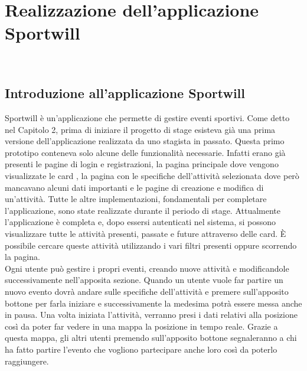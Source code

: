 
\chapter{Realizzazione dell'applicazione Sportwill}
\label{cap:Sportwill}

\\


\section{Introduzione all'applicazione Sportwill}
Sportwill è un'applicazione che permette di gestire eventi sportivi.
Come detto nel Capitolo 2, prima di iniziare il progetto di stage esisteva già una prima versione dell'applicazione realizzata da uno stagista in passato.
Questa primo prototipo conteneva solo alcune delle funzionalità necessarie.
Infatti erano già presenti le pagine di login e registrazioni, la pagina principale dove vengono visualizzate le card \cite{card}, la pagina con le specifiche dell'attività selezionata dove però mancavano alcuni dati importanti e le pagine di creazione e modifica di un'attività.
 Tutte le altre implementazioni, fondamentali per completare l'applicazione, sono state realizzate durante il periodo di stage. Attualmente l'applicazione è completa e, dopo essersi autenticati nel sistema, si possono visualizzare tutte le attività presenti, passate e future attraverso delle card.
 È possibile cercare queste attività utilizzando i vari filtri presenti oppure scorrendo la pagina.\\ 
 Ogni utente può gestire i propri eventi, creando nuove attività e modificandole successivamente nell'apposita sezione.
 Quando un utente vuole far partire un nuovo evento dovrà andare sulle specifiche dell'attività e premere sull'apposito bottone per farla iniziare e successivamente la medesima potrà essere messa anche in pausa.
 Una volta iniziata l'attività, verranno presi i dati relativi alla posizione così da poter far vedere in una mappa la posizione in tempo reale.
 Grazie a questa mappa, gli altri utenti premendo sull'apposito bottone segnaleranno a chi ha fatto partire l'evento che vogliono partecipare anche loro così da poterlo raggiungere.
 
